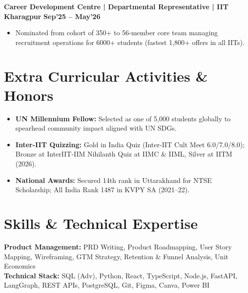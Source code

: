 \documentclass[10pt, a4paper]{article}
\newenvironment{achievelist}{
  \begin{itemize}[leftmargin=1.2em, itemsep=0.5pt, parsep=0pt, topsep=1pt]
    \small
}{
  \end{itemize}
  \vspace{-2pt}
}
\newcommand{\achieve}[1]{\item #1}
\begin{document}
\textbf{Career Development Centre | Departmental Representative | IIT Kharagpur} \hfill \textbf{\small Sep'25 -- May'26}
\begin{achievelist}
  \achieve{Nominated from cohort of 350+ to 56-member core team managing recruitment operations for 6000+ students (fastest 1,800+ offers in all IITs).}
\end{achievelist}

\vspace{-2pt}

\section{Extra Curricular Activities \& Honors}

\begin{itemize}[leftmargin=1.2em, itemsep=0.5pt, parsep=0pt, topsep=1pt]
  \small
  \item \textbf{UN Millennium Fellow:} Selected as one of 5,000 students globally to spearhead community impact aligned with UN SDGs.
  \item \textbf{Inter-IIT Quizzing:} Gold in India Quiz (Inter-IIT Cult Meet 6.0/7.0/8.0); Bronze at InterIIT-IIM Nihilanth Quiz at IIMC \& IIML, Silver at IITM (2026).
  \item \textbf{National Awards:} Secured 14th rank in Uttarakhand for NTSE Scholarship; All India Rank 1487 in KVPY SA (2021--22).
\end{itemize}

\vspace{-2pt}

\section{Skills \& Technical Expertise}

\noindent
\textbf{Product Management:} PRD Writing, Product Roadmapping, User Story Mapping, Wireframing, GTM Strategy, Retention \& Funnel Analysis, Unit Economics \\[2pt]
\textbf{Technical Stack:} SQL (Adv), Python, React, TypeScript, Node.js, FastAPI, LangGraph, REST APIs, PostgreSQL, Git, Figma, Canva, Power BI
\end{document}
